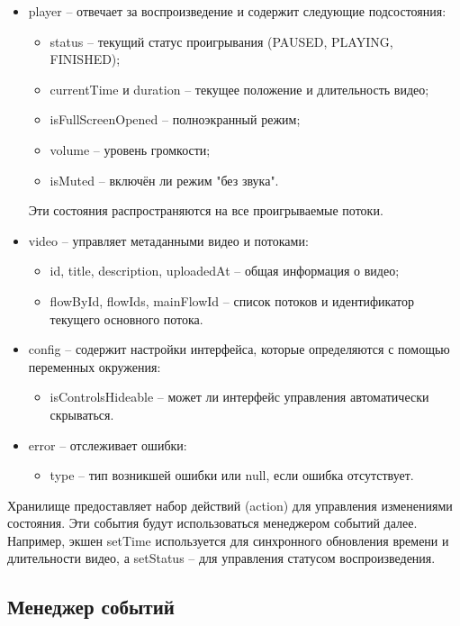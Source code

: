 	\begin{itemize}[label=$\bullet$]
		\item player – отвечает за воспроизведение и содержит следующие подсостояния:
		\begin{itemize}[label=$\circ$]
			\item status – текущий статус проигрывания (PAUSED, PLAYING, FINISHED);
			\item currentTime и duration – текущее положение и длительность видео;
			\item isFullScreenOpened – полноэкранный режим;
			\item volume – уровень громкости;
			\item isMuted – включён ли режим "без звука".
		\end{itemize}
		Эти состояния распространяются на все проигрываемые потоки.
		\item video – управляет метаданными видео и потоками:
		\begin{itemize}[label=$\circ$]
			\item id, title, description, uploadedAt – общая информация о видео;
			\item flowById, flowIds, mainFlowId – список потоков и идентификатор текущего основного потока.
		\end{itemize}
		\item config – содержит настройки интерфейса, которые определяются с помощью переменных окружения:
		\begin{itemize}[label=$\circ$]
			\item isControlsHideable – может ли интерфейс управления автоматически скрываться.
		\end{itemize}
		\item error – отслеживает ошибки:
		\begin{itemize}[label=$\circ$]
			\item type – тип возникшей ошибки или null, если ошибка отсутствует.
		\end{itemize}
	\end{itemize}

	Хранилище предоставляет набор действий (action) для управления изменениями состояния. Эти события будут использоваться менеджером событий далее. Например, экшен setTime используется для синхронного обновления времени и длительности видео, а setStatus – для управления статусом воспроизведения.

	\subsection{Менеджер событий}

